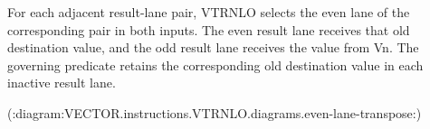 For each adjacent result-lane pair, VTRNLO selects the even lane of the
corresponding pair in both inputs.  The even result lane receives that old
destination value, and the odd result lane receives the value from Vn.  The
governing predicate retains the corresponding old destination value in each
inactive result lane.

(:diagram:VECTOR.instructions.VTRNLO.diagrams.even-lane-transpose:)
